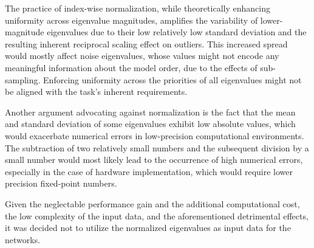 The practice of index-wise normalization, while theoretically enhancing uniformity across eigenvalue magnitudes,
amplifies the variability of lower-magnitude eigenvalues due to their low relatively low standard deviation and the
resulting inherent reciprocal scaling effect on outliers. This increased spread would mostly affect noise eigenvalues,
whose values might not encode any meaningful information about the model order, due to the effects of sub-sampling.
Enforcing uniformity across the priorities of all eigenvalues might not be aligned with the task's inherent
requirements.

Another argument advocating against normalization is the fact that the mean and standard deviation of some eigenvalues
exhibit low absolute values, which would exacerbate numerical errors in low-precision computational environments.
The subtraction of two relatively small numbers and the subsequent division by a small number would most likely lead to
the occurrence of high numerical errors, especially in the case of hardware implementation, which would require lower
precision fixed-point numbers.

Given the neglectable performance gain and the additional computational cost, the low complexity of the input data, and
the aforementioned detrimental effects, it was decided not to utilize the normalized eigenvalues as input data for the
networks.





